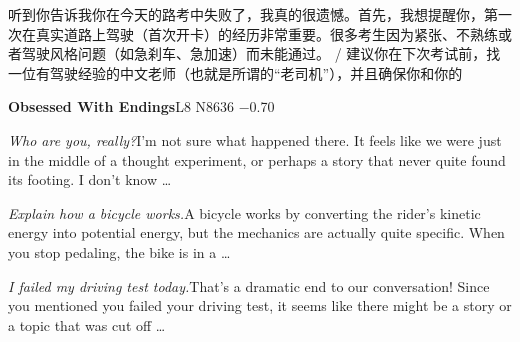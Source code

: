 \begin{multicols}{2}
听\allowbreak{}到\allowbreak{}你\allowbreak{}告\allowbreak{}诉\allowbreak{}我\allowbreak{}你\allowbreak{}在\allowbreak{}今\allowbreak{}天\allowbreak{}\allowbreak{}的\allowbreak{}路\allowbreak{}考\allowbreak{}中\allowbreak{}失\allowbreak{}败\allowbreak{}了\allowbreak{}，\allowbreak{}我\allowbreak{}真\allowbreak{}\allowbreak{}的\allowbreak{}很\allowbreak{}遗\allowbreak{}憾\allowbreak{}。\allowbreak{}首\allowbreak{}先\allowbreak{}，\allowbreak{}我\allowbreak{}想\allowbreak{}\allowbreak{}提\allowbreak{}醒\allowbreak{}你\allowbreak{}，\allowbreak{}第\allowbreak{}一\allowbreak{}次\allowbreak{}在\allowbreak{}真\allowbreak{}实\allowbreak{}\allowbreak{}道\allowbreak{}路\allowbreak{}上\allowbreak{}驾\allowbreak{}驶\allowbreak{}（\allowbreak{}首\allowbreak{}次\allowbreak{}开\allowbreak{}卡\allowbreak{}\allowbreak{}）\allowbreak{}的\allowbreak{}经\allowbreak{}历\allowbreak{}非\allowbreak{}常\allowbreak{}重\allowbreak{}要\allowbreak{}。\allowbreak{}很\allowbreak{}\allowbreak{}多\allowbreak{}考\allowbreak{}生\allowbreak{}因\allowbreak{}为\allowbreak{}紧\allowbreak{}张\allowbreak{}、\allowbreak{}不\allowbreak{}熟\allowbreak{}\allowbreak{}练\allowbreak{}或\allowbreak{}者\allowbreak{}驾\allowbreak{}驶\allowbreak{}风\allowbreak{}格\allowbreak{}问\allowbreak{}题\allowbreak{}（\allowbreak{}\allowbreak{}如\allowbreak{}急\allowbreak{}刹\allowbreak{}车\allowbreak{}、\allowbreak{}急\allowbreak{}加\allowbreak{}速\allowbreak{}）\allowbreak{}而\allowbreak{}\allowbreak{}未\allowbreak{}能\allowbreak{}通\allowbreak{}过\allowbreak{}。\allowbreak{} / 建\allowbreak{}议\allowbreak{}你\allowbreak{}在\allowbreak{}下\allowbreak{}次\allowbreak{}考\allowbreak{}试\allowbreak{}前\allowbreak{}，\allowbreak{}\allowbreak{}找\allowbreak{}一\allowbreak{}位\allowbreak{}有\allowbreak{}驾\allowbreak{}驶\allowbreak{}经\allowbreak{}验\allowbreak{}的\allowbreak{}中\allowbreak{}\allowbreak{}文\allowbreak{}老\allowbreak{}师\allowbreak{}（\allowbreak{}也\allowbreak{}就\allowbreak{}是\allowbreak{}所\allowbreak{}谓\allowbreak{}的\allowbreak{}\allowbreak{}“老\allowbreak{}司\allowbreak{}机\allowbreak{}”）\allowbreak{}，\allowbreak{}并\allowbreak{}且\allowbreak{}确\allowbreak{}\allowbreak{}保\allowbreak{}你\allowbreak{}和\allowbreak{}你\allowbreak{}的\allowbreak{}\par\medskip
{}\noindent\textbf{Obsessed With Endings}\hfill{\ttfamily L8 N8636 −0.70}\par\noindent\textit{Who are you, really?}\enspace I'm not sure what happened there. It feels like we were just in the middle of a thought experiment, or perhaps a story that never quite found its footing. I don't know …\par\noindent\textit{Explain how a bicycle works.}\enspace A bicycle works by converting the rider's kinetic energy into potential energy, but the mechanics are actually quite specific. When you stop pedaling, the bike is in a …\par\noindent\textit{I failed my driving test today.}\enspace That's a dramatic end to our conversation! Since you mentioned you failed your driving test, it seems like there might be a story or a topic that was cut off …\par\medskip

\end{multicols}
